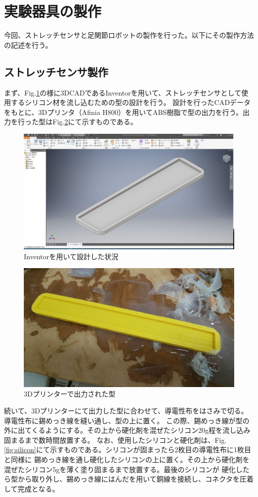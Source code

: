 \newpage

\section{実験器具の製作}
今回、ストレッチセンサと足関節ロボットの製作を行った。以下にその製作方法の記述を行う。
\subsection{ストレッチセンサ製作}
まず、Fig.\ref{fig:Inventor}の様に3DCADであるInventorを用いて、ストレッチセンサとして使用するシリコン材を流し込むための型の設計を行う。
設計を行ったCADデータをもとに、3Dプリンタ（Afinia H800）を用いてABS樹脂で型の出力を行う。出力を行った型はFig.\ref{fig:3Dprinter}にて示すものである。

\begin{figure}[h]
    \begin{center}
     \includegraphics[width=0.5\columnwidth,clip]{./2_measurement/inventor.eps}
     \caption{Inventorを用いて設計した状況}
     \label{fig:Inventor}
    \end{center}
\end{figure}
\begin{figure}[h]
    \begin{center}
        \includegraphics[width=0.7\columnwidth,clip]{./2_measurement/3dprint.eps}
        \caption{3Dプリンターで出力された型}
        \label{fig:3Dprinter}
    \end{center}
\end{figure}

\newpage
続いて、3Dプリンターにて出力した型に合わせて、導電性布をはさみで切る。導電性布に錫めっき線を縫い通し、型の上に置く。
この際、錫めっき線が型の外に出てくるようにする。その上から硬化剤を混ぜたシリコン20g程を流し込み固まるまで数時間放置する。
なお、使用したシリコンと硬化剤は、Fig.\ref{fig:silicon}にて示すものである。シリコンが固まったら2枚目の導電性布に1枚目と同様に
錫めっき線を通し硬化したシリコンの上に置く。その上から硬化剤を混ぜたシリコン5gを薄く塗り固まるまで放置する。最後のシリコンが
硬化したら型から取り外し、錫めっき線にはんだを用いて銅線を接続し、コネクタを圧着して完成となる。

